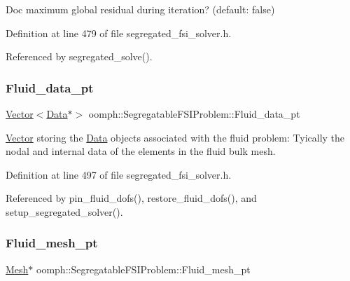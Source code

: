Doc maximum global residual during iteration? (default\+: false) 



Definition at line 479 of file segregated\+\_\+fsi\+\_\+solver.\+h.



Referenced by segregated\+\_\+solve().

\mbox{\label{classoomph_1_1SegregatableFSIProblem_a1aac015f9f0e9c1b925a534278dc1e55}} 
\subsubsection{\texorpdfstring{Fluid\+\_\+data\+\_\+pt}{Fluid\_data\_pt}}
{\footnotesize\ttfamily \hyperlink{classoomph_1_1Vector}{Vector}$<$\hyperlink{classoomph_1_1Data}{Data}$\ast$$>$ oomph\+::\+Segregatable\+F\+S\+I\+Problem\+::\+Fluid\+\_\+data\+\_\+pt\hspace{0.3cm}{\ttfamily [protected]}}



\hyperlink{classoomph_1_1Vector}{Vector} storing the \hyperlink{classoomph_1_1Data}{Data} objects associated with the fluid problem\+: Tyically the nodal and internal data of the elements in the fluid bulk mesh. 



Definition at line 497 of file segregated\+\_\+fsi\+\_\+solver.\+h.



Referenced by pin\+\_\+fluid\+\_\+dofs(), restore\+\_\+fluid\+\_\+dofs(), and setup\+\_\+segregated\+\_\+solver().

\mbox{\label{classoomph_1_1SegregatableFSIProblem_ada29fa4ef2ae7b6460887f8f04eba6bf}} 
\subsubsection{\texorpdfstring{Fluid\+\_\+mesh\+\_\+pt}{Fluid\_mesh\_pt}}
{\footnotesize\ttfamily \hyperlink{classoomph_1_1Mesh}{Mesh}$\ast$ oomph\+::\+Segregatable\+F\+S\+I\+Problem\+::\+Fluid\+\_\+mesh\+\_\+pt\hspace{0.3cm}{\ttfamily [protected]}}




